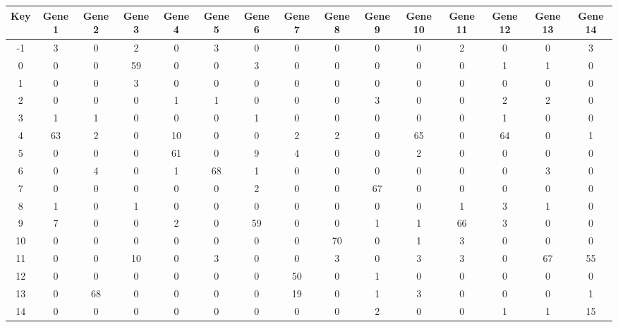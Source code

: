 \begin{tabular}{|c|c|c|c|c|c|c|c|c|c|c|c|c|c|c|}
\hline
Key & Gene 1 & Gene 2 & Gene 3 & Gene 4 & Gene 5 & Gene 6 & Gene 7 & Gene 8 & Gene 9 & Gene 10 & Gene 11 & Gene 12 & Gene 13 & Gene 14 \\
\hline
-1 & 3 & 0 & 2 & 0 & 3 & 0 & 0 & 0 & 0 & 0 & 2 & 0 & 0 & 3 \\
0 & 0 & 0 & 59 & 0 & 0 & 3 & 0 & 0 & 0 & 0 & 0 & 1 & 1 & 0 \\
1 & 0 & 0 & 3 & 0 & 0 & 0 & 0 & 0 & 0 & 0 & 0 & 0 & 0 & 0 \\
2 & 0 & 0 & 0 & 1 & 1 & 0 & 0 & 0 & 3 & 0 & 0 & 2 & 2 & 0 \\
3 & 1 & 1 & 0 & 0 & 0 & 1 & 0 & 0 & 0 & 0 & 0 & 1 & 0 & 0 \\
4 & 63 & 2 & 0 & 10 & 0 & 0 & 2 & 2 & 0 & 65 & 0 & 64 & 0 & 1 \\
5 & 0 & 0 & 0 & 61 & 0 & 9 & 4 & 0 & 0 & 2 & 0 & 0 & 0 & 0 \\
6 & 0 & 4 & 0 & 1 & 68 & 1 & 0 & 0 & 0 & 0 & 0 & 0 & 3 & 0 \\
7 & 0 & 0 & 0 & 0 & 0 & 2 & 0 & 0 & 67 & 0 & 0 & 0 & 0 & 0 \\
8 & 1 & 0 & 1 & 0 & 0 & 0 & 0 & 0 & 0 & 0 & 1 & 3 & 1 & 0 \\
9 & 7 & 0 & 0 & 2 & 0 & 59 & 0 & 0 & 1 & 1 & 66 & 3 & 0 & 0 \\
10 & 0 & 0 & 0 & 0 & 0 & 0 & 0 & 70 & 0 & 1 & 3 & 0 & 0 & 0 \\
11 & 0 & 0 & 10 & 0 & 3 & 0 & 0 & 3 & 0 & 3 & 3 & 0 & 67 & 55 \\
12 & 0 & 0 & 0 & 0 & 0 & 0 & 50 & 0 & 1 & 0 & 0 & 0 & 0 & 0 \\
13 & 0 & 68 & 0 & 0 & 0 & 0 & 19 & 0 & 1 & 3 & 0 & 0 & 0 & 1 \\
14 & 0 & 0 & 0 & 0 & 0 & 0 & 0 & 0 & 2 & 0 & 0 & 1 & 1 & 15 \\
\hline
\end{tabular}